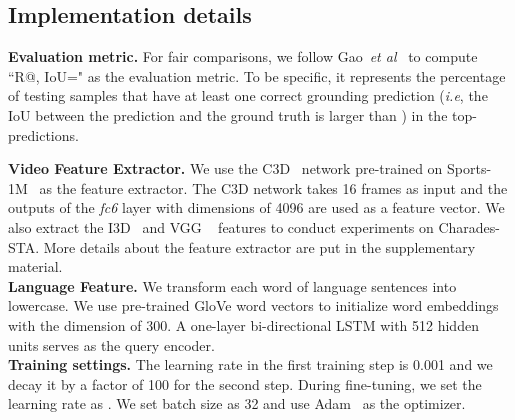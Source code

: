 \documentclass[10pt,twocolumn,letterpaper]{article}
\def\ie{\emph{i.e}\onedot} \def\Ie{\emph{I.e}\onedot}
\def\etal{\emph{et al}\onedot}
\begin{document}
	\subsection{Implementation details}
	\label{sec:Implementation}
	
	\noindent \textbf{Evaluation metric.} 
For fair comparisons, we follow Gao~\etal~\cite{gao2017tall} to compute ``R@, IoU=" as the evaluation metric. To be specific, it represents
    the percentage of testing samples that have at least one correct grounding prediction (\ie, the IoU between the prediction and the ground truth is larger than ) in the top- predictions.
	
	\noindent \textbf{Video Feature Extractor.} We use the C3D~\cite{tran2015learning} network pre-trained on Sports-1M~\cite{karpathy2014large} as the feature extractor. The C3D network takes 16 frames as input and the outputs of the \textit{fc6} layer with dimensions of 4096 are used as a feature vector. We also extract the I3D~\cite{carreira2017quo} and VGG ~\cite{simonyan2014very} features to conduct experiments on Charades-STA. More details about the feature extractor are put in the supplementary material.  \\
	\noindent \textbf{Language Feature.}
	We transform each word of language sentences into lowercase. We use pre-trained GloVe word vectors to initialize word embeddings with the dimension of 300. A one-layer bi-directional LSTM with 512 hidden units serves as the query encoder. \\
\noindent \textbf{Training settings.}
	The learning rate in the first training step is 0.001 and we decay it by a factor of 100 for the second step. During fine-tuning, we set the learning rate as . We set batch size as 32 and use Adam~\cite{kingma2014adam} as the optimizer.
	
\end{document}
